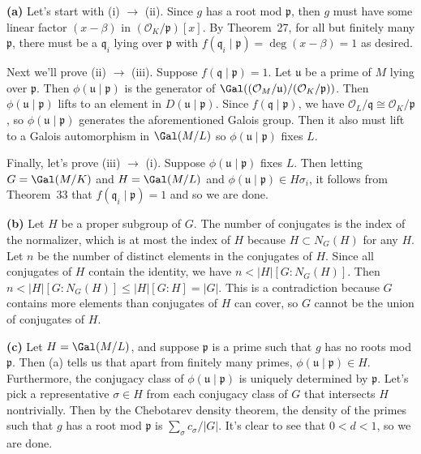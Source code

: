 \documentclass[11pt,letterpaper]{article}
\begin{document}
\begin{solution}
    \textbf{(a)} Let's start with (i) $\to$ (ii). Since $g$ has a root mod $\mathfrak{p}$, then $g$ must have some linear factor $(x-\beta)$ in $(\mathcal{O}_K/\mathfrak{p})[x]$. By Theorem~27, for all but finitely many $\mathfrak{p}$, there must be a $\mathfrak{q}_i$ lying over $\mathfrak{p}$ with $f(\mathfrak{q}_i\mid \mathfrak{p})=\deg (x-\beta)=1$ as desired.

    Next we'll prove (ii) $\to$ (iii). Suppose $f(\mathfrak{q}\mid \mathfrak{p})=1$. Let $\mathfrak{u}$ be a prime of $M$ lying over $\mathfrak{p}$. Then $\phi(\mathfrak{u}\mid \mathfrak{p})$ is the generator of $\Gal((\mathcal{O}_M/\mathfrak{u})/(\mathcal{O}_K/\mathfrak{p}))$. Then $\phi(\mathfrak{u}\mid \mathfrak{p})$ lifts to an element in $D(\mathfrak{u}\mid \mathfrak{p})$. Since $f(\mathfrak{q}\mid\mathfrak{p})$, we have $\mathcal{O}_L/\mathfrak{q} \cong \mathcal{O}_K/\mathfrak{p}$, so $\phi(\mathfrak{u}\mid \mathfrak{p})$ generates the aforementioned Galois group. Then it also must lift to a Galois automorphism in $\Gal(M/L)$ so $\phi(\mathfrak{u}\mid \mathfrak{p})$ fixes $L$.

    Finally, let's prove (iii) $\to$ (i). Suppose $\phi(\mathfrak{u}\mid \mathfrak{p})$ fixes $L$. Then letting $G=\Gal(M/K)$ and $H=\Gal(M/L)$ and $\phi(\mathfrak{u}\mid \mathfrak{p})\in H\sigma_i$, it follows from Theorem~33 that $f(\mathfrak{q}_i\mid \mathfrak{p})=1$ and so we are done.

    \textbf{(b)} Let $H$ be a proper subgroup of $G$. The number of conjugates is the index of the normalizer, which is at most the index of $H$ because $H\subset N_G(H)$ for any $H$. Let $n$ be the number of distinct elements in the conjugates of $H$. Since all conjugates of $H$ contain the identity, we have $n < |H|[ G:N_G(H)]$. Then $n < |H|[G: N_G(H)]\leq |H|[G:H]=|G|.$ This is a contradiction because $G$contains more elements than conjugates of $H$ can cover, so $G$ cannot be the union of conjugates of $H$.

    \textbf{(c)} Let $H=\Gal(M/L)$, and suppose $\mathfrak{p}$ is a prime such that $g$ has no roots mod $\mathfrak{p}$. Then (a) tells us that apart from finitely many primes, $\phi(\mathfrak{u}\mid \mathfrak{p})\in H$. Furthermore, the conjugacy class of $\phi(\mathfrak{u}\mid \mathfrak{p})$ is uniquely determined by $\mathfrak{p}$. Let's pick a representative $\sigma\in H$ from each conjugacy class of $G$ that intersects $H$ nontrivially. Then by the Chebotarev density theorem, the density of the primes such that $g$ has a root mod $\mathfrak{p}$ is $\sum_\sigma c_\sigma / |G|$. It's clear to see that $0<d<1$, so we are done.
\end{solution}
\end{document}
